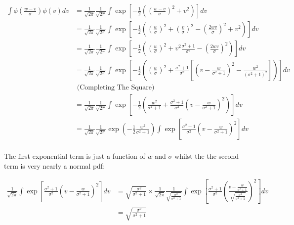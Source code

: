 \documentclass{article}
\begin{document}
\begin{align*}
\int \phi\left(\frac{w - v}{\sigma}\right) \phi(v) dv  &= 
\frac{1}{\sqrt{2\pi}} \frac{1}{\sqrt{2\pi}} 
\int \exp \left[
    -\frac{1}{2} 
    \left(
        \left(\frac{w - v}{\sigma}\right)^2 +
        v^2
    \right)
\right] dv \\
&= 
\frac{1}{\sqrt{2\pi}} \frac{1}{\sqrt{2\pi}} 
\int \exp \left[
    -\frac{1}{2} 
    \left(
        \left(\frac{w }{\sigma}\right)^2 +
        \left(\frac{v }{\sigma}\right)^2 
        -\left(\frac{2wv }{\sigma}\right)^2 +
        v^2
    \right)
\right] dv \\
&=
\frac{1}{\sqrt{2\pi}} \frac{1}{\sqrt{2\pi}} 
 \int \exp \left[
    -\frac{1}{2} 
    \left(
        \left(\frac{w }{\sigma}\right)^2 +
        v^2 \frac{\sigma^2 + 1}{\sigma^2}  
        -\left(\frac{2wv }{\sigma}\right)^2 
    \right)
\right] dv \\
&=
\frac{1}{\sqrt{2\pi}} \frac{1}{\sqrt{2\pi}} 
 \int \exp \left[
    -\frac{1}{2} 
    \left(
        \left(\frac{w }{\sigma}\right)^2 +
        \frac{\sigma^2 + 1}{\sigma^2} \left[
            \left(
                v - \frac{w}{\sigma^2 + 1}
            \right)^2 - \frac{w^2}{(\sigma^2 + 1)^2}
        \right]
    \right)
\right] dv \\ &\text{ (Completing  The Square)} \\
&=
\frac{1}{\sqrt{2\pi}} \frac{1}{\sqrt{2\pi}} 
 \int \exp \left[
    -\frac{1}{2} 
    \left(
        \frac{w^2 }{\sigma^2 + 1} +
        \frac{\sigma^2 + 1}{\sigma^2} 
            \left(
                v - \frac{w}{\sigma^2 + 1}
            \right)^2 
    \right)
\right] dv \  \\
&= 
\frac{1}{\sqrt{2\pi}} \frac{1}{\sqrt{2\pi}} 
 \exp \left(
    -\frac{1}{2} 
        \frac{w^2 }{\sigma^2 + 1}
         \right)
\int \exp\left[
        \frac{\sigma^2 + 1}{\sigma^2} 
            \left(
                v - \frac{w}{\sigma^2 + 1}
            \right)^2 
\right] dv \  \\
\end{align*}

The first exponential term is just a function of $w$ and $\sigma$ 
whilst the the second term is very nearly a normal pdf:

\begin{align*}
\frac{1}{\sqrt{2\pi}}
\int \exp\left[
        \frac{\sigma^2 + 1}{\sigma^2} 
            \left(
                v - \frac{w}{\sigma^2 + 1}
            \right)^2 
\right] dv &=  
                    \sqrt{
                        \frac{\sigma^2}{\sigma^2 + 1}
                    } \times
\frac{1}{\sqrt{2\pi}} 
\frac{1}{
                    \sqrt{
                        \frac{\sigma^2}{\sigma^2 + 1}
                    }
}
\int \exp\left[
        \frac{\sigma^2 + 1}{\sigma^2} 
            \left(
                \frac{v - \frac{w}{\sigma^2 + 1}}{
                    \sqrt{
                        \frac{\sigma^2}{\sigma^2 + 1}
                    }
                }
            \right)^2 
\right] dv  \\
&= 
                    \sqrt{
                        \frac{\sigma^2}{\sigma^2 + 1}
                    } 
\end{align*}
\end{document}
